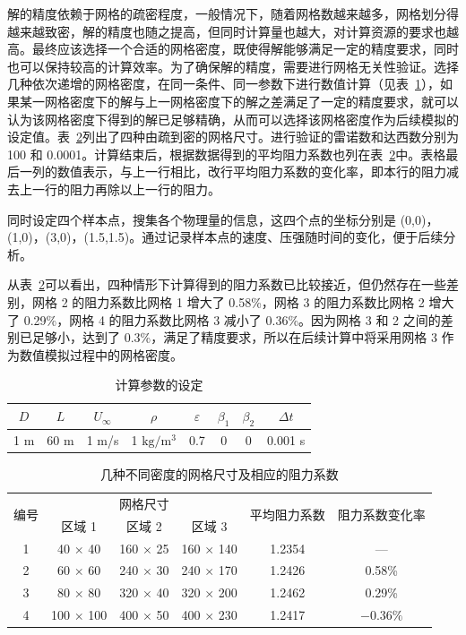 解的精度依赖于网格的疏密程度，一般情况下，随着网格数越来越多，网格划分得越来越致密，解的精度也随之提高，但同时计算量也越大，对计算资源的要求也越高。最终应该选择一个合适的网格密度，既使得解能够满足一定的精度要求，同时也可以保持较高的计算效率。为了确保解的精度，需要进行网格无关性验证。选择几种依次递增的网格密度，在同一条件、同一参数下进行数值计算（见表~\ref{tab: parameters}），如果某一网格密度下的解与上一网格密度下的解之差满足了一定的精度要求，就可以认为该网格密度下得到的解已足够精确，从而可以选择该网格密度作为后续模拟的设定值。表~\ref{tab: grid}列出了四种由疏到密的网格尺寸。进行验证的雷诺数和达西数分别为 100 和 0.0001。计算结束后，根据数据得到的平均阻力系数也列在表~\ref{tab: grid}中。表格最后一列的数值表示，与上一行相比，改行平均阻力系数的变化率，即本行的阻力减去上一行的阻力再除以上一行的阻力。

同时设定四个样本点，搜集各个物理量的信息，这四个点的坐标分别是 (0,0)，(1,0)，(3,0)，(1.5,1.5)。通过记录样本点的速度、压强随时间的变化，便于后续分析。

从表~\ref{tab: grid}可以看出，四种情形下计算得到的阻力系数已比较接近，但仍然存在一些差别，网格 2 的阻力系数比网格 1 增大了 0.58\%，网格 3 的阻力系数比网格 2 增大了 0.29\%，网格 4 的阻力系数比网格 3 减小了 0.36\%。因为网格 3 和 2 之间的差别已足够小，达到了 0.3\%，满足了精度要求，所以在后续计算中将采用网格 3 作为数值模拟过程中的网格密度。

\begin{table}[ht]
	\caption{计算参数的设定}\label{tab: parameters}
	\vspace{.5em}\centering\wuhao
	\begin{tabular}{*{8}{c}}
		\toprule[1.5pt]
		$D$ & $L$ & $U_{\infty}$ & $\rho$ & $\varepsilon$ & $\beta_1$ & $\beta_2$ & $\Delta t$\\
		\midrule[1pt]
		1 m & 60 m & 1 m/s & 1 $\mathrm{kg}/\mathrm{m}^3$ & 0.7 & 0 & 0 & 0.001 s\\
		\bottomrule[1.5pt]
	\end{tabular}
\end{table}

\begin{table}[ht]
	\caption{几种不同密度的网格尺寸及相应的阻力系数}\label{tab: grid}
	\vspace{.5em}\centering\wuhao
	\begin{tabular}{cccccc}
		\toprule[1.5pt]
		\multirow{2}[3]{*}{编号} & \multicolumn{3}{c}{网格尺寸} & \multirow{2}[3]{*}{平均阻力系数} & \multirow{2}[3]{*}{阻力系数变化率} \\
		\cmidrule[.67pt](lr){2-4}
		& 区域 1 & 区域 2 & 区域 3 & & \\
		\midrule[1pt]
		1 & 40 $\times$ 40 & 160 $\times$ 25 & 160 $\times$ 140 & 1.2354 & — \\
		2 & 60 $\times$ 60 & 240 $\times$ 30 & 240 $\times$ 170 & 1.2426 & 0.58\% \\
		3 & 80 $\times$ 80 & 320 $\times$ 40 & 320 $\times$ 200 & 1.2462 & 0.29\% \\
		4 & 100 $\times$ 100 & 400 $\times$ 50 & 400 $\times$ 230 & 1.2417 & $-0.36\%$ \\
		\bottomrule[1.5pt]
	\end{tabular}
\end{table}

